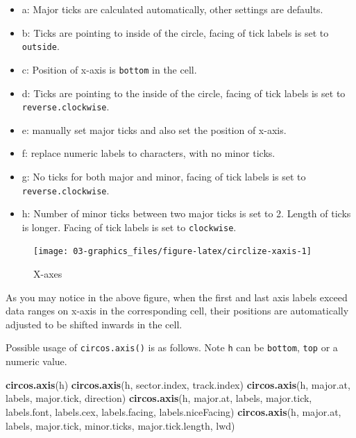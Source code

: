 \documentclass[]{book}
\newenvironment{Shaded}{\begin{snugshade}}{\end{snugshade}}
\newcommand{\KeywordTok}[1]{\textcolor[rgb]{0.13,0.29,0.53}{\textbf{#1}}}
\newcommand{\NormalTok}[1]{#1}
\providecommand{\tightlist}{%
  \setlength{\itemsep}{0pt}\setlength{\parskip}{0pt}}
\begin{document}
\begin{itemize}
\tightlist
\item
  a: Major ticks are calculated automatically, other settings are
  defaults.
\item
  b: Ticks are pointing to inside of the circle, facing of tick labels
  is set to \texttt{outside}.
\item
  c: Position of x-axis is \texttt{bottom} in the cell.
\item
  d: Ticks are pointing to the inside of the circle, facing of tick
  labels is set to \texttt{reverse.clockwise}.
\item
  e: manually set major ticks and also set the position of x-axis.
\item
  f: replace numeric labels to characters, with no minor ticks.
\item
  g: No ticks for both major and minor, facing of tick labels is set to
  \texttt{reverse.clockwise}.
\item
  h: Number of minor ticks between two major ticks is set to 2. Length
  of ticks is longer. Facing of tick labels is set to
  \texttt{clockwise}.
\end{itemize}

\begin{figure}

{\centering \texttt{[image: 03-graphics\_files/figure-latex/circlize-xaxis-1]} 

}

\caption{X-axes}\label{fig:circlize-xaxis}
\end{figure}

As you may notice in the above figure, when the first and last axis
labels exceed data ranges on x-axis in the corresponding cell, their
positions are automatically adjusted to be shifted inwards in the cell.

Possible usage of \texttt{circos.axis()} is as follows. Note \texttt{h}
can be \texttt{bottom}, \texttt{top} or a numeric value.

\begin{Shaded}
\begin{Highlighting}[]
\KeywordTok{circos.axis}\NormalTok{(h)}
\KeywordTok{circos.axis}\NormalTok{(h, sector.index, track.index)}
\KeywordTok{circos.axis}\NormalTok{(h, major.at, labels, major.tick, direction)}
\KeywordTok{circos.axis}\NormalTok{(h, major.at, labels, major.tick, labels.font, labels.cex,}
\NormalTok{            labels.facing, labels.niceFacing)}
\KeywordTok{circos.axis}\NormalTok{(h, major.at, labels, major.tick, minor.ticks,}
\NormalTok{            major.tick.length, lwd)}
\end{Highlighting}
\end{Shaded}
\end{document}
